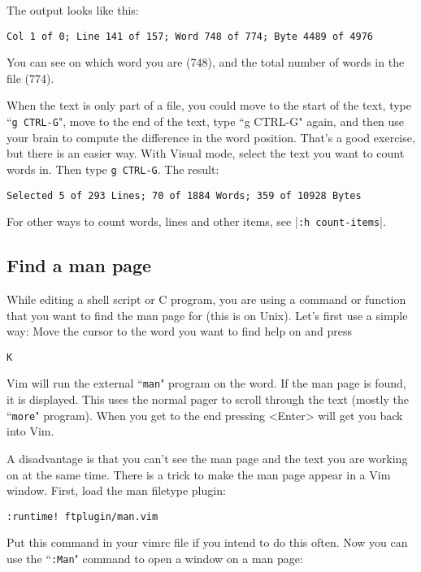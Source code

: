 The output looks like this:

\begin{Verbatim}[samepage=true]
    Col 1 of 0; Line 141 of 157; Word 748 of 774; Byte 4489 of 4976
\end{Verbatim}

You can see on which word you are (748), and the total number of words in the file (774).

When the text is only part of a file, you could move to the start of the text, type ``\texttt{g CTRL-G}", move to the end of the text, type ``g CTRL-G" again, and then use your brain to compute the difference in the word position.
That's a good exercise, but there is an easier way.
With Visual mode, select the text you want to count words in.
Then type \texttt{g CTRL-G}.
The result:

\begin{Verbatim}[samepage=true]
    Selected 5 of 293 Lines; 70 of 1884 Words; 359 of 10928 Bytes
\end{Verbatim}

For other ways to count words, lines and other items, see |\texttt{:h count-items}|.
\subsection{Find a man page}
\label{find-manpage}
While editing a shell script or C program, you are using a command or function that you want to find the man page for (this is on Unix).
Let's first use a simple way: Move the cursor to the word you want to find help on and press

\begin{Verbatim}[samepage=true]
 K
\end{Verbatim}

Vim will run the external ``\texttt{man}" program on the word.
If the man page is found, it is displayed.
This uses the normal pager to scroll through the text (mostly the ``\texttt{more}" program).
When you get to the end pressing <Enter> will get you back into Vim.

A disadvantage is that you can't see the man page and the text you are working on at the same time.
There is a trick to make the man page appear in a Vim window.
First, load the man filetype plugin:

\begin{Verbatim}[samepage=true]
 :runtime! ftplugin/man.vim
\end{Verbatim}

Put this command in your vimrc file if you intend to do this often.
Now you can use the ``\texttt{:Man}" command to open a window on a man page:

